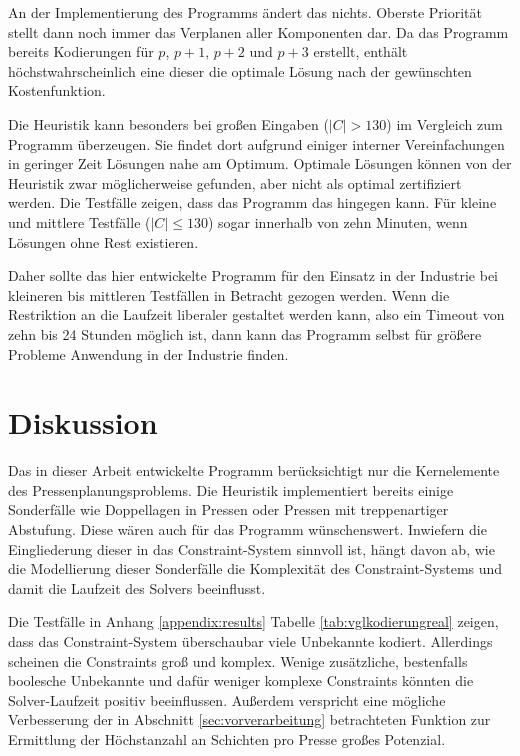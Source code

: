 An der Implementierung des Programms ändert das nichts.
Oberste Priorität stellt dann noch immer das Verplanen aller Komponenten dar.
Da das Programm bereits Kodierungen für $p$, $p+1$, $p+2$ und $p+3$ erstellt, enthält höchstwahrscheinlich eine dieser die optimale Lösung nach der gewünschten Kostenfunktion.

Die Heuristik kann besonders bei großen Eingaben ($\lvert C \rvert > 130$) im Vergleich zum Programm überzeugen.
Sie findet dort aufgrund einiger interner Vereinfachungen in geringer Zeit Lösungen nahe am Optimum.
Optimale Lösungen können von der Heuristik zwar möglicherweise gefunden, aber nicht als optimal zertifiziert werden.
Die Testfälle zeigen, dass das Programm das hingegen kann.
Für kleine und mittlere Testfälle ($\lvert C \rvert \leq 130$) sogar innerhalb von zehn Minuten, wenn Lösungen ohne Rest existieren.

Daher sollte das hier entwickelte Programm für den Einsatz in der Industrie bei kleineren bis mittleren Testfällen in Betracht gezogen werden.
Wenn die Restriktion an die Laufzeit liberaler gestaltet werden kann, also ein Timeout von zehn bis 24 Stunden möglich ist, dann kann das Programm selbst für
größere Probleme Anwendung in der Industrie finden.

\section{Diskussion}
Das in dieser Arbeit entwickelte Programm berücksichtigt nur die Kernelemente des Pressenplanungsproblems.
Die Heuristik implementiert bereits einige Sonderfälle wie Doppellagen in Pressen oder Pressen mit treppenartiger Abstufung.
Diese wären auch für das Programm wünschenswert.
Inwiefern die Eingliederung dieser in das Constraint-System sinnvoll ist, hängt davon ab,
wie die Modellierung dieser Sonderfälle die Komplexität des Constraint-Systems und damit die Laufzeit des Solvers beeinflusst.

Die Testfälle in Anhang \ref{appendix:results} Tabelle \ref{tab:vglkodierungreal} zeigen, dass das Constraint-System überschaubar viele Unbekannte kodiert.
Allerdings scheinen die Constraints groß und komplex.
Wenige zusätzliche, bestenfalls boolesche Unbekannte und dafür weniger komplexe Constraints könnten die Solver-Laufzeit positiv beeinflussen.
Außerdem verspricht eine mögliche Verbesserung der in Abschnitt \ref{sec:vorverarbeitung} betrachteten Funktion zur Ermittlung der Höchstanzahl an Schichten pro Presse großes Potenzial.

